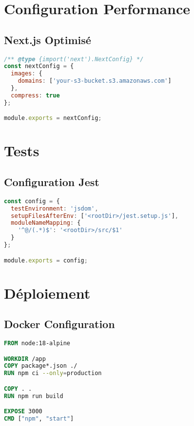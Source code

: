 \section{Configuration Performance}

\subsection{Next.js Optimisé}

\begin{lstlisting}[language=javascript,caption=Configuration Next.js de base]
/** @type {import('next').NextConfig} */
const nextConfig = {
  images: {
    domains: ['your-s3-bucket.s3.amazonaws.com']
  },
  compress: true
};

module.exports = nextConfig;
\end{lstlisting}

\section{Tests}

\subsection{Configuration Jest}

\begin{lstlisting}[language=javascript,caption=Configuration Jest simplifiée]
const config = {
  testEnvironment: 'jsdom',
  setupFilesAfterEnv: ['<rootDir>/jest.setup.js'],
  moduleNameMapping: {
    '^@/(.*)$': '<rootDir>/src/$1'
  }
};

module.exports = config;
\end{lstlisting}

\section{Déploiement}

\subsection{Docker Configuration}

\begin{lstlisting}[language=dockerfile,caption=Dockerfile de base]
FROM node:18-alpine

WORKDIR /app
COPY package*.json ./
RUN npm ci --only=production

COPY . .
RUN npm run build

EXPOSE 3000
CMD ["npm", "start"]
\end{lstlisting}

